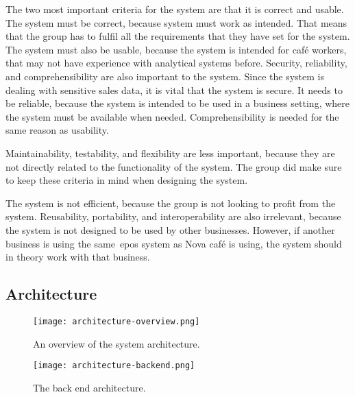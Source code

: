 The two most important criteria for the system are that it is correct and usable.
The system must be correct, because system must work as intended.
That means that the group has to fulfil all the requirements that they have set for the system.
The system must also be usable, because the system is intended for café workers, that may not have experience with
analytical systems before.
Security, reliability, and comprehensibility are also important to the system.
Since the system is dealing with sensitive sales data, it is vital that the system is secure.
It needs to be reliable, because the system is intended to be used in a business setting, where the system must be 
available when needed.
Comprehensibility is needed for the same reason as usability.

Maintainability, testability, and flexibility are less important, because they are not directly related to the
functionality of the system.
The group did make sure to keep these criteria in mind when designing the system.

The system is not efficient, because the group is not looking to profit from the system.
Reusability, portability, and interoperability are also irrelevant, because the system is not designed to be used by
other businesses.
However, if another business is using the same~\acrshort{epos} system as Nova café is using, the system should in
theory work with that business.

\subsection{Architecture}\label{subsec:architecture}

\begin{figure}[H]
    \centering
    \texttt{[image: architecture-overview.png]}
    \caption{An overview of the system architecture.
    }\label{fig:architecture-overview}
\end{figure}

\begin{figure}[H]
    \centering
    \texttt{[image: architecture-backend.png]}
    \caption{The back end architecture.
    }\label{fig:architecture-backend}
\end{figure}


